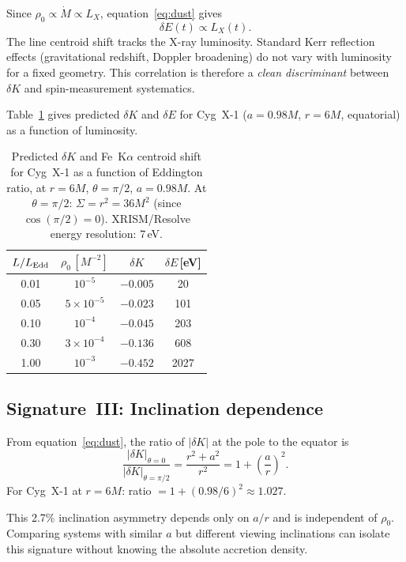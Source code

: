 \documentclass[12pt,a4paper]{article}
\begin{document}
Since $\rho_0\propto\dot{M}\propto L_X$, equation~\eqref{eq:dust}
gives
\begin{equation}\label{eq:correlation}
  \delta E(t) \propto L_X(t).
\end{equation}
The line centroid shift tracks the X-ray luminosity.
Standard Kerr reflection effects (gravitational redshift, Doppler
broadening) do not vary with luminosity for a fixed geometry.
This correlation is therefore a \emph{clean discriminant} between
$\delta K$ and spin-measurement systematics.

Table~\ref{tab:lum} gives predicted $\delta K$ and $\delta E$
for Cyg~X-1 ($a=0.98M$, $r=6M$, equatorial) as a function of
luminosity.

\begin{table}[h]
\centering
\renewcommand{\arraystretch}{1.3}
\begin{tabular}{@{}cccc@{}}
\toprule
$L/L_{\rm Edd}$ & $\rho_0\,[M^{-2}]$ & $\delta K$ & $\delta E$\,[eV] \\
\midrule
0.01 & $10^{-5}$ & $-0.005$ & 20 \\
0.05 & $5\times10^{-5}$ & $-0.023$ & 101 \\
0.10 & $10^{-4}$ & $-0.045$ & 203 \\
0.30 & $3\times10^{-4}$ & $-0.136$ & 608 \\
1.00 & $10^{-3}$ & $-0.452$ & 2027 \\
\bottomrule
\end{tabular}
\caption{Predicted $\delta K$ and Fe~K$\alpha$ centroid shift
for Cyg~X-1 as a function of Eddington ratio,
at $r=6M$, $\theta=\pi/2$, $a=0.98M$.
At $\theta=\pi/2$: $\Sigma=r^2=36M^2$ (since $\cos(\pi/2)=0$).
XRISM/Resolve energy resolution: 7\,eV.}
\label{tab:lum}
\end{table}

\subsection{Signature~III: Inclination dependence}

From equation~\eqref{eq:dust}, the ratio of $|\delta K|$ at
the pole to the equator is
\begin{equation}
  \frac{|\delta K|_{\theta=0}}{|\delta K|_{\theta=\pi/2}}
  = \frac{r^2+a^2}{r^2} = 1 + \left(\frac{a}{r}\right)^2.
\end{equation}
For Cyg~X-1 at $r=6M$: ratio $= 1+(0.98/6)^2\approx1.027$.

This 2.7\% inclination asymmetry depends only on $a/r$ and is
independent of $\rho_0$.
Comparing systems with similar $a$ but different viewing
inclinations can isolate this signature without knowing the
absolute accretion density.
\end{document}
